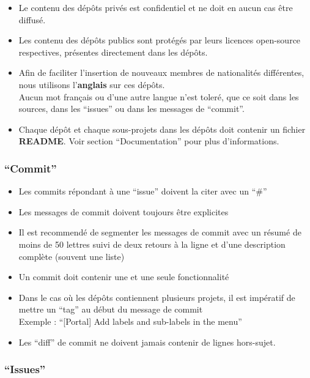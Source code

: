 \documentclass{life-fr}
\begin{document}
\begin{itemize}
  \item Le contenu des dépôts privés est confidentiel et ne doit en
    aucun cas être diffusé.
  \item Les contenu des dépôts publics sont protégés par leurs licences
    open-source respectives, présentes directement dans les dépôts.
  \item Afin de faciliter l'insertion de nouveaux membres de nationalités
    différentes, nous utilisons l'\textbf{anglais} sur ces dépôts.\\
    Aucun mot français ou d'une autre langue n'est toleré, que ce soit
    dans les sources, dans les ``issues'' ou dans les messages de ``commit''.
  \item Chaque dépôt et chaque sous-projets dans les dépôts doit contenir
    un fichier \textbf{README}. Voir section ``Documentation'' pour
    plus d'informations.
\end{itemize}

\subsubsection{``Commit''}

\begin{itemize}
  \item Les commits répondant à une ``issue'' doivent la citer avec un ``\#''
  \item Les messages de commit doivent toujours être explicites
  \item Il est recommendé de segmenter les messages de commit avec un
    résumé de moins de 50 lettres suivi de deux retours à la ligne
    et d'une description complète (souvent une liste)
  \item Un commit doit contenir une et une seule fonctionnalité
  \item Dans le cas où les dépôts contiennent plusieurs projets,
    il est impératif de mettre un ``tag'' au début du message de commit\\
    Exemple : ``[Portal] Add labels and sub-labels in the menu''
  \item Les ``diff'' de commit ne doivent jamais contenir de lignes
    hors-sujet.
\end{itemize}

\subsubsection{``Issues''}
\end{document}
